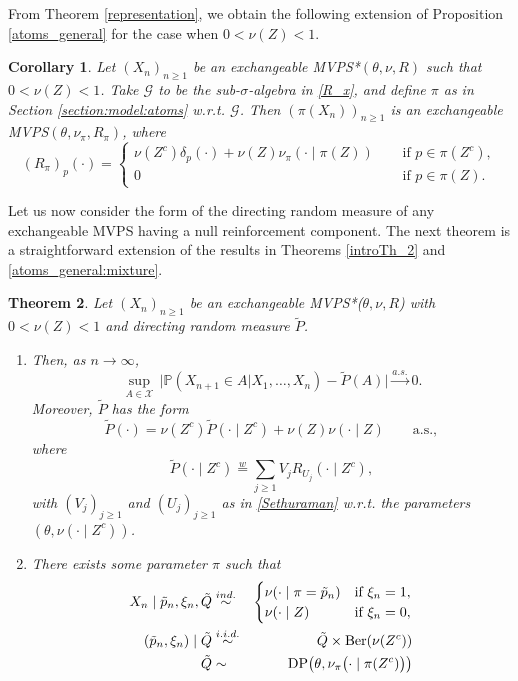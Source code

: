 \documentclass[a4paper]{article}
\theoremstyle{plain}
\newtheorem{theorem}{Theorem}
\newtheorem{corollary}[theorem]{Corollary}
\theoremstyle{remark}
\theoremstyle{definition}
\begin{document}
From Theorem \ref{representation}, we obtain the following extension of Proposition \ref{atoms_general} for the case when $0<\nu(Z)<1$.

\begin{corollary}\label{atoms_null_case}
Let $(X_n)_{n\geq 1}$ be an exchangeable MVPS*$(\theta,\nu,R)$ such that $0<\nu(Z)<1$. Take $\mathcal{G}$ to be the sub-$\sigma$-algebra in \eqref{R_x}, and define $\pi$ as in Section \ref{section:model:atoms} w.r.t. $\mathcal{G}$. Then $(\pi(X_n))_{n\geq 1}$ is an exchangeable MVPS$(\theta,\nu_\pi,R_\pi)$, where
\begin{equation}\label{atoms_null_case:eq}
(R_\pi)_p(\cdot)=\begin{cases}\nu(Z^c)\delta_p(\cdot)+\nu(Z)\nu_\pi(\cdot\mid\pi(Z)) \hspace{15pt}&\text{if $p\in \pi(Z^c)$},\\ 0&\text{if $p\in \pi(Z)$}.\end{cases}
\end{equation}
\end{corollary}

Let us now consider the form of the directing random measure of any exchangeable MVPS having a null reinforcement component. The next theorem is a straightforward extension of the results in Theorems \ref{introTh_2} and \ref{atoms_general:mixture}.

\begin{theorem}\label{directing_rm}
Let $(X_n)_{n\geq 1}$ be an exchangeable MVPS*($\theta,\nu,R$) with $0<\nu(Z)<1$ and directing random measure $\tilde{P}$.
\begin{enumerate}
\item Then, as $n\rightarrow\infty$,
\[\sup_{A\in\mathcal{X}}\,\bigl|\mathbb{P}(X_{n+1}\in A|X_1,\ldots,X_n)-\tilde{P}(A)\bigr|\overset{a.s.}{\longrightarrow}0.\]
Moreover, $\tilde{P}$ has the form
\[\tilde{P}(\cdot)=\nu(Z^c)\tilde{P}(\cdot\mid Z^c)+\nu(Z)\nu(\cdot \mid Z)\qquad\mbox{a.s.},\]
where
\[\tilde{P}(\cdot \mid Z^c)\overset{w}{=}\sum_{j\geq1}V_jR_{U_j}(\cdot \mid Z^c),\]
with $(V_j)_{j\geq 1}$ and $(U_j)_{j\geq 1}$ as in \eqref{Sethuraman} w.r.t. the parameters $(\theta,\nu(\cdot\mid Z^c))$.\vspace{0.2cm}
\item There exists some parameter $\pi$ such that
\begin{eqnarray}
X_n \mid \tilde{p}_n,\xi_n,\tilde{Q} & \overset{ind.}{\sim} & \begin{cases} \nu(\cdot\mid \pi=\tilde{p}_n) & \mbox{if }\xi_n=1, \nonumber\\ \nu(\cdot\mid Z) & \mbox{if }\xi_n=0, \end{cases}\\
(\tilde{p}_n,\xi_n)\mid \tilde{Q} & \overset{i.i.d.}{\sim} & \tilde{Q}\times\textnormal{Ber}(\nu(Z^c)) \nonumber\\
\tilde{Q} & \sim & \textnormal{DP}\bigl(\theta,\nu_\pi\bigl(\cdot\mid\pi(Z^c)\bigr)\bigr) \nonumber
\end{eqnarray}
\end{enumerate}
\end{theorem}
\end{document}
